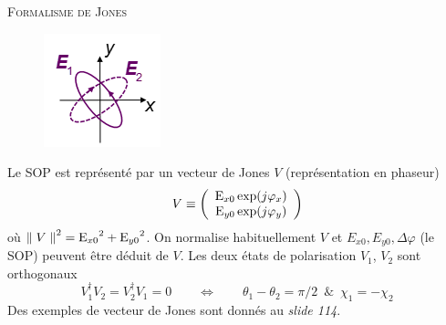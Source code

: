 	\textsc{Formalisme de Jones}\\
		\begin{figure}
	\vspace{-5mm}
	\includegraphics[scale=0.8]{ch1/image41}
	\end{figure}
	Le SOP est représenté par un vecteur de Jones $V$ (représentation en phaseur)
	\begin{equation}
	V \equiv \left( {\begin{array}{*{20}{c}}
{{{\rm{E}}_{x0}}\exp (j{\varphi _x})}\\
{{{\rm{E}}_{y0}}\exp (j{\varphi _y})}
\end{array}} \right)
	\end{equation}
	où ${\left\| {\;V\;} \right\|^2} = {{\rm{E}}_{x0}}^2 + {{\rm{E}}_{y0}}^2$. On normalise 
	habituellement $V$ et $E_{x0}, E_{y0}, \Delta \varphi$ (le SOP) peuvent être déduit de $V$. Les
	deux états de polarisation $V_1$, $V_2$ sont orthogonaux
	\begin{equation}
	V_1^\dag {V_2} = V_2^\dag {V_1} = 0\qquad\Leftrightarrow\qquad {\theta _1} - {\theta _2} = \pi /
	2\,\,\,\& \,\,\,{\chi _1} =  - {\chi _2}
	\end{equation}
	Des exemples de vecteur de Jones sont donnés au \textit{slide 114}.\\
	
